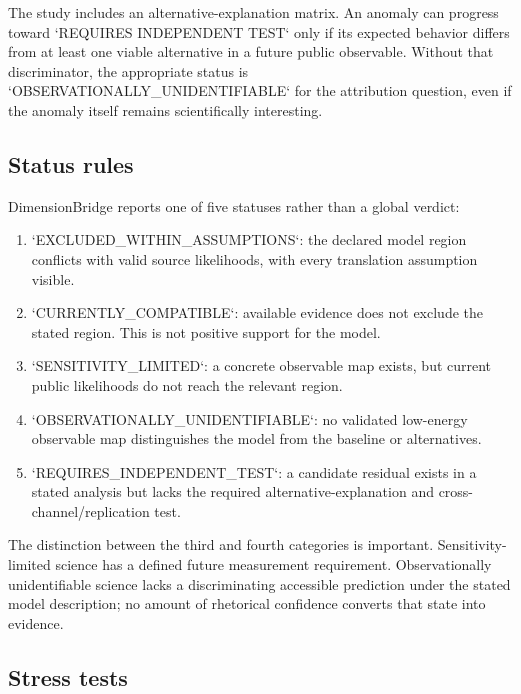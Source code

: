 \documentclass[conference]{IEEEtran}
\begin{document}
The study includes an alternative-explanation matrix. An anomaly can progress toward `REQUIRES INDEPENDENT TEST` only if its expected behavior differs from at least one viable alternative in a future public observable. Without that discriminator, the appropriate status is `OBSERVATIONALLY\_UNIDENTIFIABLE` for the attribution question, even if the anomaly itself remains scientifically interesting.

\subsection{Status rules}

DimensionBridge reports one of five statuses rather than a global verdict:

\begin{enumerate}[leftmargin=*,nosep]
\item `EXCLUDED\_WITHIN\_ASSUMPTIONS`: the declared model region conflicts with valid source likelihoods, with every translation assumption visible.
\item `CURRENTLY\_COMPATIBLE`: available evidence does not exclude the stated region. This is not positive support for the model.
\item `SENSITIVITY\_LIMITED`: a concrete observable map exists, but current public likelihoods do not reach the relevant region.
\item `OBSERVATIONALLY\_UNIDENTIFIABLE`: no validated low-energy observable map distinguishes the model from the baseline or alternatives.
\item `REQUIRES\_INDEPENDENT\_TEST`: a candidate residual exists in a stated analysis but lacks the required alternative-explanation and cross-channel/replication test.
\end{enumerate}

The distinction between the third and fourth categories is important. Sensitivity-limited science has a defined future measurement requirement. Observationally unidentifiable science lacks a discriminating accessible prediction under the stated model description; no amount of rhetorical confidence converts that state into evidence.

\subsection{Stress tests}
\end{document}
